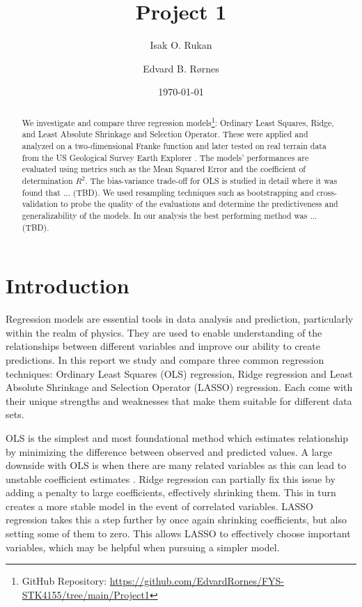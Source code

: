 \documentclass[%
reprint,
amsmath,amssymb,
aps,
pra,
]{revtex4-2}
\begin{document}
	
\title{Project 1}
\author{Isak O. Rukan}
\author{Edvard B. Rørnes}
\date{\today}

\begin{abstract}
	We investigate and compare three regression models\footnote{GitHub Repository: \url{https://github.com/EdvardRornes/FYS-STK4155/tree/main/Project1}}: Ordinary Least Squares, Ridge, and Least Absolute Shrinkage and Selection Operator. These were applied and analyzed on a two-dimensional Franke function and later tested on real terrain data from the US Geological Survey Earth Explorer \cite{USGS_EarthExplorer}. The models' performances are evaluated using metrics such as the Mean Squared Error and the coefficient of determination $R^2$. The bias-variance trade-off for OLS is studied in detail where it was found that ... (TBD). We used resampling techniques such as bootstrapping and cross-validation to probe the quality of the evaluations and determine the predictiveness and generalizability of the models. In our analysis the best performing method was ... (TBD).
\end{abstract}

\maketitle

\section{Introduction}
Regression models are essential tools in data analysis and prediction, particularly within the realm of physics. They are used to enable understanding of the relationships between different variables and improve our ability to create predictions. In this report we study and compare three common regression techniques: Ordinary Least Squares (OLS) regression, Ridge regression and Least Absolute Shrinkage and Selection Operator (LASSO) regression. Each come with their unique strengths and weaknesses that make them suitable for different data sets. 

OLS is the simplest and most foundational method which estimates relationship by minimizing the difference between observed and predicted values. A large downside with OLS is when there are many related variables as this can lead to unstable coefficient estimates \cite{Bishop2006}. Ridge regression can partially fix this issue by adding a penalty to large coefficients, effectively shrinking them. This in turn creates a more stable model in the event of correlated variables. LASSO regression takes this a step further by once again shrinking coefficients, but also setting some of them to zero. This allows LASSO to effectively choose important variables, which may be helpful when pursuing a simpler model.
\end{document}
